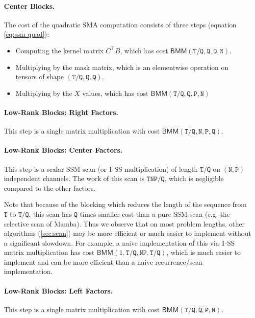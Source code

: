 \paragraph{Center Blocks.}
The cost of the quadratic SMA computation consists of three steps (equation \eqref{eq:ssm-quad}):
\begin{itemize}
  \item Computing the kernel matrix $C^{\top} B$, which has cost $\mathsf{BMM}(\mathtt{T}/\mathtt{Q}, \mathtt{Q}, \mathtt{Q}, \mathtt{N})$.
  \item Multiplying by the mask matrix, which is an elementwise operation on tensors of shape $(\mathtt{T}/\mathtt{Q}, \mathtt{Q}, \mathtt{Q})$.
  \item Multiplying by the $X$ values, which has cost $\mathsf{BMM}(\mathtt{T}/\mathtt{Q}, \mathtt{Q}, \mathtt{P}, \mathtt{N})$
\end{itemize}

\paragraph{Low-Rank Blocks: Right Factors.}
This step is a single matrix multiplication with cost $\mathsf{BMM}(\mathtt{T}/\mathtt{Q}, \mathtt{N}, \mathtt{P}, \mathtt{Q})$.

\paragraph{Low-Rank Blocks: Center Factors.}
This step is a scalar SSM scan (or 1-SS multiplication) of length $\mathtt{T}/\mathtt{Q}$ on $(\mathtt{N}, \mathtt{P})$ independent channels.
The work of this scan is $\mathtt{TNP}/\mathtt{Q}$, which is negligible compared to the other factors.

Note that because of the blocking which reduces the length of the sequence from $\mathtt{T}$ to $\mathtt{T}/\mathtt{Q}$,
this scan has $\mathtt{Q}$ times smaller cost than a pure SSM scan (e.g. the selective scan of Mamba).
Thus we observe that on most problem lengths,
other algorithms (\cref{sec:scan}) may be more efficient or much easier to implement without a significant slowdown.
For example, a naive implementation of this via 1-SS matrix multiplication has cost $\mathsf{BMM}(1, \mathtt{T}/\mathtt{Q}, \mathtt{NP}, \mathtt{T}/\mathtt{Q})$,
which is much easier to implement and can be more efficient than a naive recurrence/scan implementation.

\paragraph{Low-Rank Blocks: Left Factors.}
This step is a single matrix multiplication with cost $\mathsf{BMM}(\mathtt{T}/\mathtt{Q}, \mathtt{Q}, \mathtt{P}, \mathtt{N})$.

